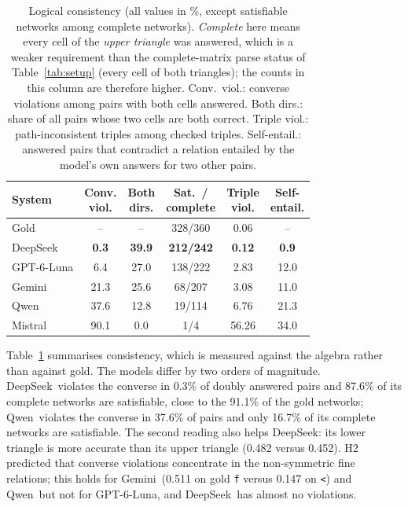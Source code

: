 \documentclass[11pt]{article}
\newcommand{\rel}[1]{\texttt{#1}}
\newcommand{\Ds}{DeepSeek}
\newcommand{\Gp}{GPT-6-Luna}
\newcommand{\Gm}{Gemini}
\newcommand{\Qw}{Qwen}
\newcommand{\Ms}{Mistral}
\begin{document}
\begin{table}[t]
\centering
\small
\setlength{\tabcolsep}{3.2pt}
\begin{tabular}{l ccccc}
\toprule
System & \makecell{Conv.\\viol.} & \makecell{Both\\dirs.} & \makecell{Sat.\ /\\complete} & \makecell{Triple\\viol.} & \makecell{Self-\\entail.} \\
\midrule
Gold & -- & -- & 328/360 & 0.06 & -- \\
\Ds & \textbf{0.3} & \textbf{39.9} & \textbf{212/242} & \textbf{0.12} & \textbf{0.9} \\
\Gp & 6.4 & 27.0 & 138/222 & 2.83 & 12.0 \\
\Gm & 21.3 & 25.6 & 68/207 & 3.08 & 11.0 \\
\Qw & 37.6 & 12.8 & 19/114 & 6.76 & 21.3 \\
\Ms & 90.1 & 0.0 & 1/4 & 56.26 & 34.0 \\
\bottomrule
\end{tabular}
\caption{Logical consistency (all values in \%, except satisfiable networks among complete networks). \emph{Complete} here means every cell of the \emph{upper triangle} was answered, which is a weaker requirement than the complete-matrix parse status of Table~\ref{tab:setup} (every cell of both triangles); the counts in this column are therefore higher. Conv.\ viol.: converse violations among pairs with both cells answered. Both dirs.: share of all pairs whose two cells are both correct. Triple viol.: path-inconsistent triples among checked triples. Self-entail.: answered pairs that contradict a relation entailed by the model's own answers for two other pairs.}
\label{tab:consistency}
\end{table}

Table~\ref{tab:consistency} summarises consistency, which is measured against the algebra rather than against gold. The models differ by two orders of magnitude. \Ds\ violates the converse in 0.3\% of doubly answered pairs and 87.6\% of its complete networks are satisfiable, close to the 91.1\% of the gold networks; \Qw\ violates the converse in 37.6\% of pairs and only 16.7\% of its complete networks are satisfiable. The second reading also helps \Ds: its lower triangle is more accurate than its upper triangle (0.482 versus 0.452). H2 predicted that converse violations concentrate in the non-symmetric fine relations; this holds for \Gm\ (0.511 on gold \rel{f} versus 0.147 on \rel{<}) and \Qw\ but not for \Gp, and \Ds\ has almost no violations.
\end{document}
